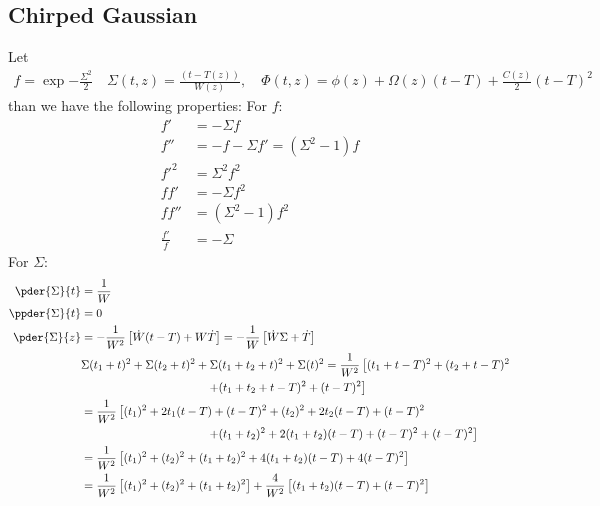 \subsection{Chirped Gaussian}
Let 
\begin{equation}\label{equ:Chriped_Gaussian_Ansatz}
\begin{split}
f = \exp{-\frac{\Sigma^2}{2}} \quad \Sigma(t,z) = \frac{\left(t - T(z)\right)}{W(z)}, \quad \Phi(t,z) = \phi(z) + \Omega(z) (t-T) + \frac{C(z)}{2} (t-T)^2
\end{split}
\end{equation}
than we have the following properties:
For $f$:
\begin{equation}
\begin{split}
f' &= -\Sigma f\\
f'' & = -f - \Sigma f' = (\Sigma^2 - 1) f \\
f'^2& = \Sigma^2 f^2 \\
ff' & = -\Sigma f^2 \\
ff''& = (\Sigma^2 - 1) f^2 \\
\frac{f'}{f} &= -\Sigma
\end{split}
\end{equation}
For $\Sigma$:
\begin{equation}
\begin{split}
\pder{\Sigma}{t} & = \frac{1}{W} \\
\ppder{\Sigma}{t} & = 0 \\
\pder{\Sigma}{z} & = -\frac{1}{W^2}\left[\dot{W} (t-T)  + W \dot{T}\right]  = -\frac{1}{W}\left[\dot{W} \Sigma   + \dot{T}\right]\\
&\Sigma(t_1+t)^2+\Sigma(t_2+t)^2+\Sigma(t_1+t_2+t)^2+\Sigma(t)^2 =\frac{1}{W^2}\left[(t_1+t-T)^2+(t_2+t-T)^2 \right. \\
&\hspace{1.5in} \left.+(t_1+t_2+t-T)^2+(t-T)^2\right]\\
&= \frac{1}{W^2} \left[ (t_1)^2 + 2 t_1 (t-T) + (t-T)^2 + (t_2)^2 + 2 t_2 (t-T) + (t-T)^2 \right. \\
&\hspace{1.5in} \left. + (t_1 + t_2)^2 + 2 (t_1+t_2) (t-T) + (t-T)^2  + (t-T)^2 \right] \\
&= \frac{1}{W^2} \left[ (t_1)^2 + (t_2)^2 + (t_1 + t_2)^2  + 4 (t_1+t_2) (t-T)  + 4(t-T)^2 \right] \\
&= \frac{1}{W^2} \left[ (t_1)^2 + (t_2)^2 + (t_1 + t_2)^2 \right] + \frac{4}{W^2} \left[ (t_1+t_2) (t-T)  + (t-T)^2 \right] \\
\end{split}
\end{equation}
